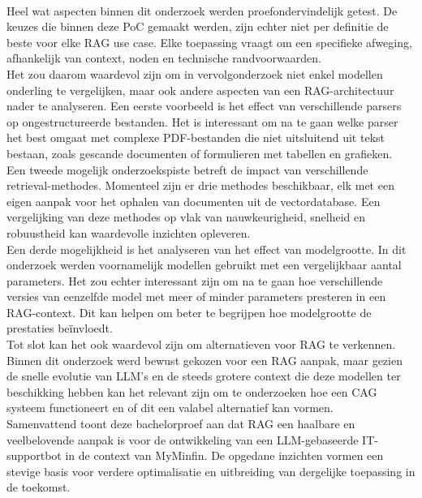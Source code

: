 \\[1em]
Heel wat aspecten binnen dit onderzoek werden proefondervindelijk getest. De keuzes die binnen deze PoC gemaakt werden, zijn echter niet per definitie de beste voor elke RAG use case. Elke toepassing vraagt om een specifieke afweging, afhankelijk van context, noden en technische randvoorwaarden.
\\[1em]
Het zou daarom waardevol zijn om in vervolgonderzoek niet enkel modellen onderling te vergelijken, maar ook andere aspecten van een RAG-architectuur nader te analyseren. Een eerste voorbeeld is het effect van verschillende parsers op ongestructureerde bestanden. Het is interessant om na te gaan welke parser het best omgaat met complexe PDF-bestanden die niet uitsluitend uit tekst bestaan, zoals gescande documenten of formulieren met tabellen en grafieken.
\\[1em]
Een tweede mogelijk onderzoekspiste betreft de impact van verschillende retrieval-methodes. Momenteel zijn er drie methodes beschikbaar, elk met een eigen aanpak voor het ophalen van documenten uit de vectordatabase. Een vergelijking van deze methodes op vlak van nauwkeurigheid, snelheid en robuustheid kan waardevolle inzichten opleveren.
\\[1em]
Een derde mogelijkheid is het analyseren van het effect van modelgrootte. In dit onderzoek werden voornamelijk modellen gebruikt met een vergelijkbaar aantal parameters. Het zou echter interessant zijn om na te gaan hoe verschillende versies van eenzelfde model met meer of minder parameters presteren in een RAG-context. Dit kan helpen om beter te begrijpen hoe modelgrootte de prestaties beïnvloedt.
\\[1em]
Tot slot kan het ook waardevol zijn om alternatieven voor RAG te verkennen. Binnen dit onderzoek werd bewust gekozen voor een RAG aanpak, maar gezien de snelle evolutie van LLM's en de steeds grotere context die deze modellen ter beschikking hebben kan het relevant zijn om te onderzoeken hoe een CAG systeem functioneert en of dit een valabel alternatief kan vormen.
\\[1em]
Samenvattend toont deze bachelorproef aan dat RAG een haalbare en veelbelovende aanpak is voor de ontwikkeling van een LLM-gebaseerde IT-supportbot in de context van MyMinfin. De opgedane inzichten vormen een stevige basis voor verdere optimalisatie en uitbreiding van dergelijke toepassing in de toekomst.